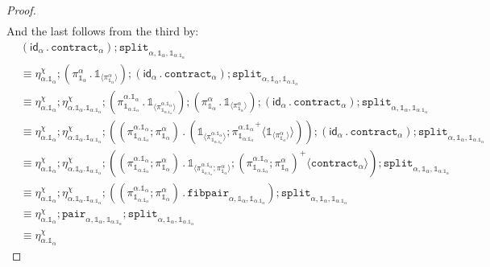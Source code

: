 \documentclass[10pt]{article}
\theoremstyle{definition}
\newcommand{\id}{\mathsf{id}}
\newcommand\bdot[0]{\mathbin{.}}
\newcommand\ApPlus[2]{\ensuremath{{#1}^+ \langle #2 \rangle }}
\newcommand\One{\ensuremath{\mathds{1}}}
\newcommand\ApOne[1]{\ensuremath{\One_{\langle {#1} \rangle }}}
\newcommand\contract[1]{\ensuremath{\mathtt{contract}_{#1}}}
\newcommand\fibpair[1]{\ensuremath{\mathtt{fibpair}_{#1}}}
\newcommand\pair[1]{\ensuremath{\mathtt{pair}_{#1}}}
\newcommand\tsplit[1]{\ensuremath{\mathtt{split}_{#1}}}
\begin{document}
\begin{proof}
\begin{align*}
\end{align*}
And the last follows from the third by:
\begin{align*}
&(\id_\alpha \bdot \contract{\alpha});\tsplit{\alpha,\One_\alpha,\One_{\alpha.\One_\alpha}} \\
&\equiv \eta^\chi_{\alpha.\One_\alpha} ; (\pi^\alpha_{\One_\alpha} \bdot \ApOne{\pi^\alpha_{\One_\alpha}}) ; (\id_\alpha \bdot \contract{\alpha});\tsplit{\alpha,\One_\alpha,\One_{\alpha.\One_\alpha}} \\
&\equiv \eta^\chi_{\alpha.\One_\alpha} ;  \eta^\chi_{\alpha.\One_\alpha.\One_{\alpha.\One_\alpha}} ; (\pi^{\alpha.\One_\alpha}_{\One_{\alpha.\One_\alpha}} \bdot \ApOne{\pi^{\alpha.\One_\alpha}_{\One_{\alpha.\One_\alpha}}}) ; (\pi^\alpha_{\One_\alpha} \bdot \ApOne{\pi^\alpha_{\One_\alpha}}) ; (\id_\alpha \bdot \contract{\alpha});\tsplit{\alpha,\One_\alpha,\One_{\alpha.\One_\alpha}} \\
&\equiv \eta^\chi_{\alpha.\One_\alpha} ;  \eta^\chi_{\alpha.\One_\alpha.\One_{\alpha.\One_\alpha}} ; ((\pi^{\alpha.\One_\alpha}_{\One_{\alpha.\One_\alpha}};\pi^\alpha_{\One_\alpha}) \bdot (\ApOne{\pi^{\alpha.\One_\alpha}_{\One_{\alpha.\One_\alpha}}};\ApPlus{\pi^{\alpha.\One_\alpha}_{\One_{\alpha.\One_\alpha}}}{\ApOne{\pi^\alpha_{\One_\alpha}}})) ; (\id_\alpha \bdot \contract{\alpha});\tsplit{\alpha,\One_\alpha,\One_{\alpha.\One_\alpha}} \\
&\equiv \eta^\chi_{\alpha.\One_\alpha};\eta^\chi_{\alpha.\One_\alpha.\One_{\alpha.\One_\alpha}};((\pi^{\alpha.\One_\alpha}_{\One_{\alpha.\One_\alpha}};\pi^\alpha_{\One_\alpha}) \bdot \ApOne{\pi^{\alpha.\One_\alpha}_{\One_{\alpha.\One_\alpha}};\pi^\alpha_{\One_\alpha}};\ApPlus{(\pi^{\alpha.\One_\alpha}_{\One_{\alpha.\One_\alpha}};\pi^\alpha_{\One_\alpha})}{\contract{\alpha}});\tsplit{\alpha,\One_\alpha,\One_{\alpha.\One_\alpha}} \\
&\equiv \eta^\chi_{\alpha.\One_\alpha};\eta^\chi_{\alpha.\One_\alpha.\One_{\alpha.\One_\alpha}};((\pi^{\alpha.\One_\alpha}_{\One_{\alpha.\One_\alpha}};\pi^\alpha_{\One_\alpha}) \bdot \fibpair{\alpha,\One_\alpha,\One_{\alpha.\One_\alpha}});\tsplit{\alpha,\One_\alpha,\One_{\alpha.\One_\alpha}} \\
&\equiv \eta^\chi_{\alpha.\One_\alpha};\pair{\alpha,\One_\alpha,\One_{\alpha.\One_\alpha}};\tsplit{\alpha,\One_\alpha,\One_{\alpha.\One_\alpha}} \\
&\equiv \eta^\chi_{\alpha.\One_\alpha}
\end{align*}
\end{proof}
\end{document}
